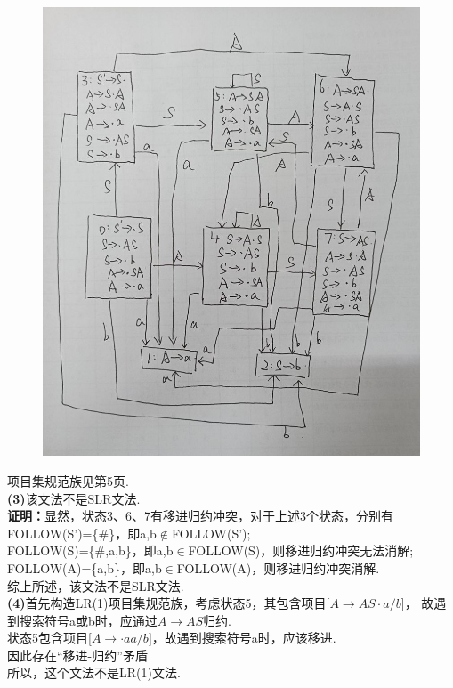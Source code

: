 \documentclass{article}
\begin{document}
\begin{figure}[htbp]
    \centering
    \includegraphics[scale=0.5]{4_1.jpg}
    \end{figure} 
项目集规范族见第5页.\\
\textbf{(3)}该文法不是SLR文法.\\
\textbf{证明：}显然，状态3、6、7有移进归约冲突，对于上述3个状态，分别有\\
FOLLOW(S’)=\{\#\}，即a,b$\notin$FOLLOW(S’);\\
FOLLOW(S)=\{\#,a,b\}，即a,b$\in$FOLLOW(S)，则移进归约冲突无法消解;\\
FOLLOW(A)=\{a,b\}，即a,b$\in$FOLLOW(A)，则移进归约冲突消解.\\
综上所述，该文法不是SLR文法.\\
\textbf{(4)}首先构造LR(1)项目集规范族，考虑状态5，其包含项目[$A\rightarrow AS\cdot a/b$]，
故遇到搜索符号a或b时，应通过$A\rightarrow AS$归约.\\
状态5包含项目[$A\rightarrow\cdot a a/b]$，故遇到搜索符号a时，应该移进.\\
因此存在“移进-归约”矛盾\\
所以，这个文法不是LR(1)文法.\\
\end{document}

